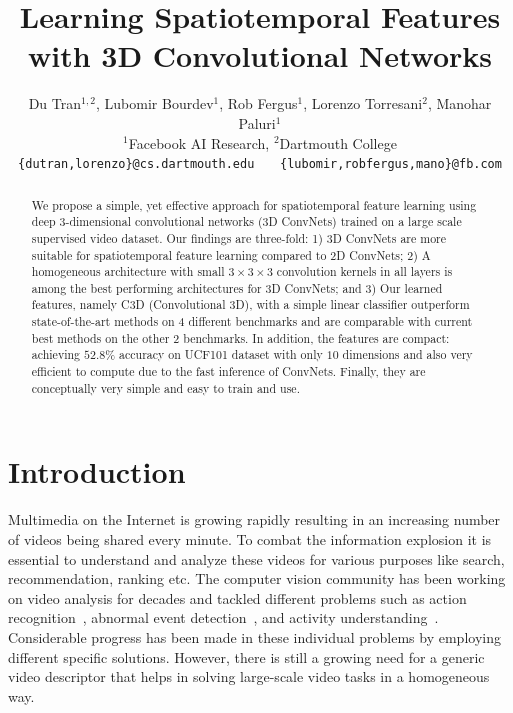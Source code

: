 \documentclass[10pt,twocolumn,letterpaper]{article}
\begin{document}
\title{Learning Spatiotemporal Features with 3D Convolutional Networks}


\author{Du Tran$^{1,2}$, Lubomir Bourdev$^1$, Rob Fergus$^1$, Lorenzo Torresani$^2$, Manohar Paluri$^1$\\
$^1$Facebook AI Research, $^2$Dartmouth College\\
{\tt\small \{dutran,lorenzo\}@cs.dartmouth.edu} \ \ \ {\tt\small \{lubomir,robfergus,mano\}@fb.com}
}


\maketitle


\vspace{-12pt}
\begin{abstract}

We propose a simple, yet effective approach for spatiotemporal feature learning using deep 3-dimensional convolutional networks (3D ConvNets) trained on a large scale supervised video dataset. Our findings are three-fold: 1) 3D ConvNets are more suitable for spatiotemporal feature learning compared to 2D ConvNets; 2) A homogeneous architecture with small $3 \times 3 \times 3$ convolution kernels in all layers is among the best performing architectures for 3D ConvNets; and 3) Our learned features, namely C3D (Convolutional 3D), with a simple linear classifier outperform state-of-the-art methods on 4 different benchmarks and are comparable with current best methods on the other 2 benchmarks. In addition, the features are compact: achieving $52.8\%$ accuracy on UCF101 dataset with only $10$ dimensions and also very efficient to compute due to the fast inference of ConvNets. Finally, they are conceptually very simple and easy to train and use.

\end{abstract}
 
\vspace{-12pt}
\section{Introduction}
\label{sec:intro}

Multimedia on the Internet is growing rapidly resulting in an increasing number of videos being shared every minute. To combat the information explosion it is essential to understand and analyze these videos for various purposes like search, recommendation, ranking etc. The computer vision community has been working on video analysis for decades and tackled different problems such as action recognition~\cite{Laptev03}, abnormal event detection~\cite{Boiman07}, and activity understanding~\cite{Kitani12}. Considerable progress has been made in these individual problems by employing different specific solutions. However, there is still a growing need for a generic video descriptor that helps in solving large-scale video tasks in a homogeneous way.
\end{document}
